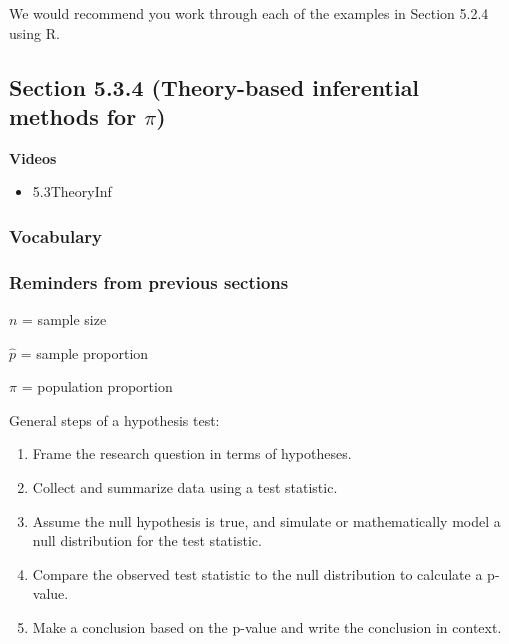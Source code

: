 \documentclass[
]{report}
\providecommand{\tightlist}{%
  \setlength{\itemsep}{0pt}\setlength{\parskip}{0pt}}
\begin{document}
We would recommend you work through each of the examples in Section 5.2.4 using R.

\hypertarget{section-5.3.4-theory-based-inferential-methods-for-pi}{%
\subsection*{\texorpdfstring{Section 5.3.4 (Theory-based inferential methods for \(\pi\))}{Section 5.3.4 (Theory-based inferential methods for \textbackslash pi)}}\label{section-5.3.4-theory-based-inferential-methods-for-pi}}


\textbf{Videos}

\begin{itemize}
\tightlist
\item
  5.3TheoryInf
\end{itemize}


\hypertarget{vocabulary-12}{%
\subsubsection*{Vocabulary}\label{vocabulary-12}}

\hypertarget{reminders-from-previous-sections-1}{%
\subsubsection*{Reminders from previous sections}\label{reminders-from-previous-sections-1}}

\(n\) = sample size

\(\hat{p}\) = sample proportion

\(\pi\) = population proportion

General steps of a hypothesis test:

\begin{enumerate}
\def\labelenumi{\arabic{enumi}.}
\item
  Frame the research question in terms of hypotheses.
\item
  Collect and summarize data using a test statistic.
\item
  Assume the null hypothesis is true, and simulate or mathematically model a null distribution for the test statistic.
\item
  Compare the observed test statistic to the null distribution to calculate a p-value.
\item
  Make a conclusion based on the p-value and write the conclusion in context.
\end{enumerate}
\end{document}
